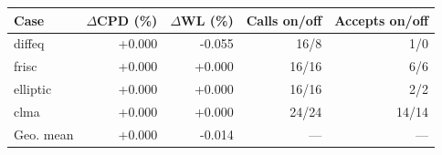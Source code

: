\begin{tabular}{lrrrr}
\toprule
Case & $\Delta$CPD (\%) & $\Delta$WL (\%) & Calls on/off & Accepts on/off \\
\midrule
diffeq & +0.000 & -0.055 & 16/8 & 1/0 \\
frisc & +0.000 & +0.000 & 16/16 & 6/6 \\
elliptic & +0.000 & +0.000 & 16/16 & 2/2 \\
clma & +0.000 & +0.000 & 24/24 & 14/14 \\
\midrule
Geo. mean & +0.000 & -0.014 & --- & --- \\
\bottomrule
\end{tabular}
